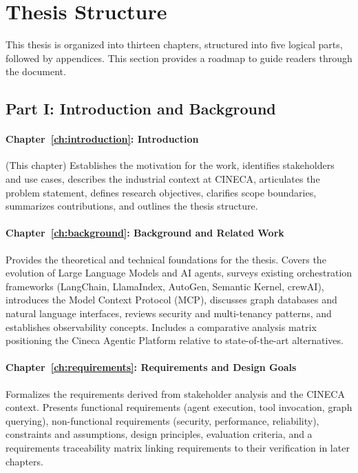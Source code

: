
\section{Thesis Structure}
\label{sec:thesis-structure}

This thesis is organized into thirteen chapters, structured into five logical parts, followed by appendices. This section provides a roadmap to guide readers through the document.

\subsection{Part I: Introduction and Background}

\paragraph{Chapter~\ref{ch:introduction}: Introduction}
(This chapter) Establishes the motivation for the work, identifies stakeholders and use cases, describes the industrial context at CINECA, articulates the problem statement, defines research objectives, clarifies scope boundaries, summarizes contributions, and outlines the thesis structure.

\paragraph{Chapter~\ref{ch:background}: Background and Related Work}
Provides the theoretical and technical foundations for the thesis. Covers the evolution of Large Language Models and AI agents, surveys existing orchestration frameworks (LangChain, LlamaIndex, AutoGen, Semantic Kernel, crewAI), introduces the Model Context Protocol (MCP), discusses graph databases and natural language interfaces, reviews security and multi-tenancy patterns, and establishes observability concepts. Includes a comparative analysis matrix positioning the Cineca Agentic Platform relative to state-of-the-art alternatives.

\paragraph{Chapter~\ref{ch:requirements}: Requirements and Design Goals}
Formalizes the requirements derived from stakeholder analysis and the CINECA context. Presents functional requirements (agent execution, tool invocation, graph querying), non-functional requirements (security, performance, reliability), constraints and assumptions, design principles, evaluation criteria, and a requirements traceability matrix linking requirements to their verification in later chapters.

